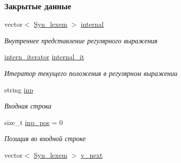 \subsubsection*{Закрытые данные}
\begin{DoxyCompactItemize}
\item 
\hypertarget{class_mygrep_ae33c6f986c7fdcc1a92a4fe041a333b8}{}vector$<$ \hyperlink{class_syn__lexem}{Syn\+\_\+lexem} $>$ \hyperlink{class_mygrep_ae33c6f986c7fdcc1a92a4fe041a333b8}{internal}\label{class_mygrep_ae33c6f986c7fdcc1a92a4fe041a333b8}

\begin{DoxyCompactList}\small\item\em Внутреннее представление регулярного выражения \end{DoxyCompactList}\item 
\hypertarget{class_mygrep_a7109fb756258cb50b8c3920a55ff6b80}{}\hyperlink{class_mygrep_ab095dfb9624dcc11dc8b51399d15f429}{intern\+\_\+iterator} \hyperlink{class_mygrep_a7109fb756258cb50b8c3920a55ff6b80}{internal\+\_\+it}\label{class_mygrep_a7109fb756258cb50b8c3920a55ff6b80}

\begin{DoxyCompactList}\small\item\em Итератор текущего положения в регулярном выражении \end{DoxyCompactList}\item 
\hypertarget{class_mygrep_a116ceb6b78f1ea12fb5ba0b0d00dedd7}{}string \hyperlink{class_mygrep_a116ceb6b78f1ea12fb5ba0b0d00dedd7}{inp}\label{class_mygrep_a116ceb6b78f1ea12fb5ba0b0d00dedd7}

\begin{DoxyCompactList}\small\item\em Входная строка \end{DoxyCompactList}\item 
\hypertarget{class_mygrep_a218804650aa95ac793b34d444821033b}{}size\+\_\+t \hyperlink{class_mygrep_a218804650aa95ac793b34d444821033b}{inp\+\_\+pos} = 0\label{class_mygrep_a218804650aa95ac793b34d444821033b}

\begin{DoxyCompactList}\small\item\em Позиция во входной строке \end{DoxyCompactList}\item 
\hypertarget{class_mygrep_a15c0407904f221e633c756c2f0c4d454}{}vector$<$ \hyperlink{class_syn__lexem}{Syn\+\_\+lexem} $>$ \hyperlink{class_mygrep_a15c0407904f221e633c756c2f0c4d454}{v\+\_\+next}\label{class_mygrep_a15c0407904f221e633c756c2f0c4d454}


\end{DoxyCompactItemize}
